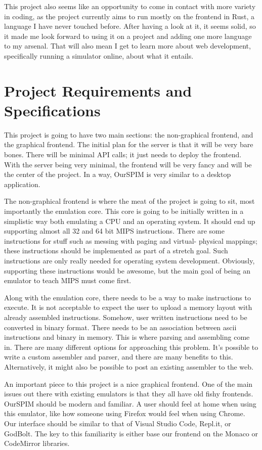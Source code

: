 \documentclass[parskip=half, fontsize=12pt]{scrartcl}
\begin{document}
This project also seems like an opportunity to come in contact with more variety in coding, as the project currently aims to run mostly on the frontend in Rust, a language I have never touched before. After having a look at it, it seems solid, so it made me look forward to using it on a project and adding one more language to my arsenal. That will also mean I get to learn more about web development, specifically running a simulator online, about what it entails.



\section{Project Requirements and Specifications}
This project is going to have two main sections: the non-graphical frontend, and the graphical frontend.  The initial plan for the server is that it will be very bare bones. There will be minimal API calls; it just needs to deploy the frontend. With the server being very minimal, the frontend will be very fancy and will be the center of the project. In a way, OurSPIM is very similar to a desktop application.

The non-graphical frontend is where the meat of the project is going to sit, most importantly the emulation core. This core is going to be initially written in a simplistic way both emulating a CPU and an operating system. It should end up supporting almost all 32 and 64 bit MIPS instructions. There are some instructions for stuff such as messing with paging and virtual- physical mappings; these instructions should be implemented as part of a stretch goal. Such instructions are only really needed for operating system development. Obviously, supporting these instructions would be awesome, but the main goal of being an emulator to teach MIPS must come first. 

Along with the emulation core, there needs to be a way to make instructions to execute. It is not acceptable to expect the user to upload a memory layout with already assembled instructions. Somehow, user written instructions need to be converted in binary format. There needs to be an association between ascii instructions and binary in memory. This is where parsing and assembling come in. There are many different options for approaching this problem. It's possible to write a custom assembler and parser, and there are many benefits to this. Alternatively, it might also be possible to post an existing assembler to the web.

An important piece to this project is a nice graphical frontend. One of the main issues out there with existing emulators is that they all have old fishy frontends. OurSPIM should be modern and familiar. A user should feel at home when using this emulator, like how someone using Firefox would feel when using Chrome. Our interface should be similar to that of Visual Studio Code, Repl.it, or GodBolt. The key to this familiarity is either base our frontend on the Monaco or CodeMirror libraries. 
\end{document}
